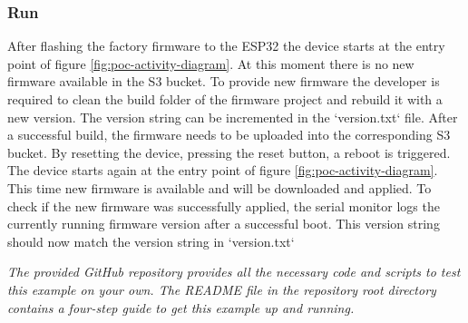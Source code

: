 \subsubsection{Run}
After flashing the factory firmware to the ESP32 the device starts at the entry point of figure \ref{fig:poc-activity-diagram}. At this moment there is no new firmware available in the S3 bucket. To provide new firmware the developer is required to clean the build folder of the firmware project and rebuild it with a new version. The version string can be incremented in the `version.txt` file. After a successful build, the firmware needs to be uploaded into the corresponding S3 bucket. By resetting the device, pressing the reset button, a reboot is triggered. The device starts again at the entry point of figure \ref{fig:poc-activity-diagram}. This time new firmware is available and will be downloaded and applied. To check if the new firmware was successfully applied, the serial monitor logs the currently running firmware version after a successful boot. This version string should now match the version string in `version.txt`

\bigskip
\textit{The provided GitHub repository provides all the necessary code and scripts to test this example on your own. The README file in the repository root directory contains a four-step guide to get this example up and running.}
